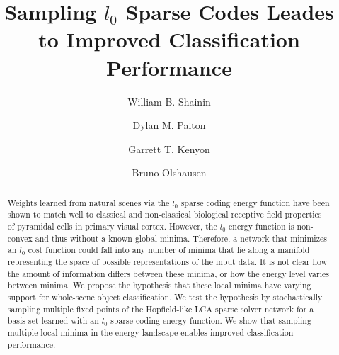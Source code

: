 \documentclass[smallextended]{svjour3}       %
\begin{document}
\title{Sampling $l_0$ Sparse Codes Leades to Improved Classification Performance
}



\author{William B. Shainin \and
        Dylan M. Paiton \and
        Garrett T. Kenyon \and
        Bruno Olshausen}





\date{}

\maketitle

\begin{abstract}
Weights learned from natural scenes via the $l_{0}$ sparse coding energy function have been shown to match well to classical and non-classical biological receptive field properties of pyramidal cells in primary visual cortex. However, the $l_{0}$ energy function is non-convex and thus without a known global minima. Therefore, a network that minimizes an $l_{0}$ cost function could fall into any number of minima that lie along a manifold representing the space of possible representations of the input data. It is not clear how the amount of information differs between these minima, or how the energy level varies between minima. We propose the hypothesis that these local minima have varying support for whole-scene object classification. We test the hypothesis by stochastically sampling multiple fixed points of the Hopfield-like LCA sparse solver network for a basis set learned with an $l_{0}$ sparse coding energy function. We show that sampling multiple local minima in the energy landscape enables improved classification performance.
\end{abstract}

%

\end{document}
